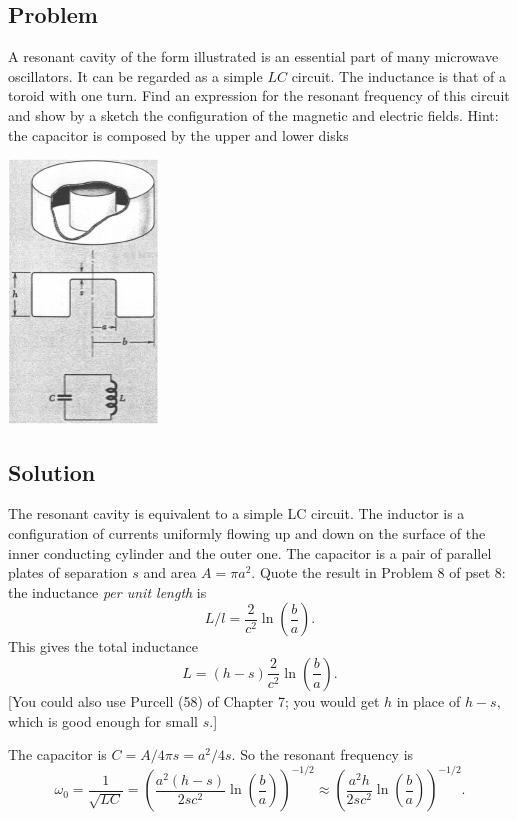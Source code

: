 \documentclass[solutions]{esg8022pset}
\begin{document}
\subsection{Problem}
  A resonant cavity of the form illustrated is an essential part of many
  microwave oscillators. It can be regarded as a simple $LC$ circuit. The
  inductance is that of a toroid with one turn. Find an expression for the
  resonant frequency of this circuit and show by a sketch the configuration
  of the magnetic and electric fields.
  Hint: the capacitor is composed by the upper and lower disks
  \begin{center}
    \includegraphics[width = 4cm]{pu807}
  \end{center}
\subsection{Solution}
  The resonant cavity is equivalent to a simple LC circuit.  The
  inductor is a configuration of currents uniformly flowing up and down
  on the surface of the inner conducting cylinder and the outer one.
  The capacitor is a pair of parallel plates of separation $s$ and area
  $A=\pi a^2$.  Quote the result in Problem 8 of pset 8: the inductance
  \emph{per unit length} is
  \[ L/l =\frac{2}{c^2}\ln{(\frac{b}{a})}.\]
  This gives the total inductance
  \[ L= (h-s)\frac{2}{c^2}\ln{(\frac{b}{a})}.\]
  [You could also use Purcell (58) of Chapter 7; you would get $h$ in place of $h-s$, which is good enough
  for small $s$.]

  The capacitor is $C= A/4\pi s= a^2/4s$.  So the resonant frequency is
  \begin{equation}
  \omega_0=\frac{1}{\sqrt{LC}}= \left(\frac{a^2
  (h-s)}{2sc^2}\ln(\frac{b}{a})\right)^{-1/2}
  \approx  \left(\frac{a^2
  h}{2sc^2}\ln(\frac{b}{a})\right)^{-1/2}.
  \end{equation}
\end{document}
